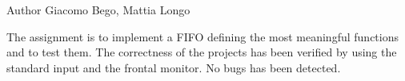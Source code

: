 \begin{DoxyAuthor}{Author}
Giacomo Bego, Mattia Longo
\end{DoxyAuthor}
The assignment is to implement a FIFO defining the most meaningful functions and to test them. The correctness of the projects has been verified by using the standard input and the frontal monitor. No bugs has been detected. 